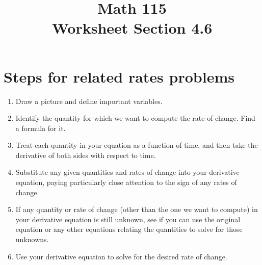 \documentclass[11pt]{exam}
\title{\vspace{-0.5in} Math 115 \\ Worksheet Section 4.6}
\date{}
\begin{document}
\maketitle
\vspace{-0.75in}
\section*{Steps for related rates problems}
\begin{enumerate}
\item Draw a picture and define important variables.
\item Identify the
  quantity for which we want to compute the rate of change. Find a
  formula for it.
\item Treat each quantity in your equation as a
  function of time, and then take the derivative of both sides with
  respect to time.
\item Substitute any given quantities and rates of
  change into your derivative equation, paying particularly close
  attention to the sign of any rates of change.
\item If any quantity or
  rate of change (other than the one we want to compute) in your
  derivative equation is still unknown, see if you can use the
  original equation or any other equations relating the quantities to
  solve for those unknowns.
\item Use your derivative equation to solve
  for the desired rate of change.
\end{enumerate}
\end{document}
